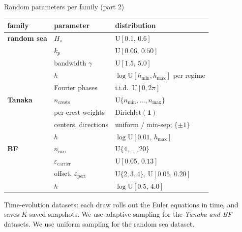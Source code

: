 \documentclass[aspectratio=169,11pt]{beamer}
\begin{document}
\begin{frame}{Random parameters per family (part 2)}

\scriptsize
\renewcommand{\arraystretch}{0.85}
\begin{tabular}{lll}
\toprule
family & parameter & distribution \\
\midrule
\textbf{random sea} & $H_s$                  & $\mathrm{U}[0.1,\,0.6]$ \\
                    & $k_p$                  & $\mathrm{U}[0.06,\,0.50]$ \\
                    & bandwidth $\gamma$     & $\mathrm{U}[1.5,\,5.0]$ \\
                    & $h$                    & $\log\mathrm{U}[h_{\min},h_{\max}]$ per regime \\
                    & Fourier phases         & i.i.d.\ $\mathrm{U}[0, 2\pi]$ \\
\midrule
\textbf{Tanaka}     & $n_{\text{crests}}$    & $\mathrm{U}\{n_{\min}, \ldots, n_{\max}\}$ \\
                    & per-crest weights      & Dirichlet$(\mathbf{1})$ \\
                    & centers, directions    & uniform / min-sep; $\{\pm 1\}$ \\
                    & $h$                    & $\log\mathrm{U}[0.01,\,h_{\max}]$ \\
\midrule
\textbf{BF}         & $n_{\text{carr}}$      & $\mathrm{U}\{4, \ldots, 20\}$ \\
                    & $\varepsilon_{\text{carrier}}$ & $\mathrm{U}[0.05,\,0.13]$ \\
                    & offset, $\varepsilon_{\text{pert}}$ & $\mathrm{U}\{2,3,4\}$, $\mathrm{U}[0.05,\,0.20]$ \\
                    & $h$                    & $\log\mathrm{U}[0.5,\,4.0]$ \\
\bottomrule
\end{tabular}

\vspace{0.2em}
\scriptsize
Time-evolution datasets: each draw rolls out the Euler equations in time, and saves $K$ saved snapshots.
We use adaptive sampling for the \emph{Tanaka and BF} datasets. We use uniform sampling for the random sea dataset.
\end{frame}
\end{document}
